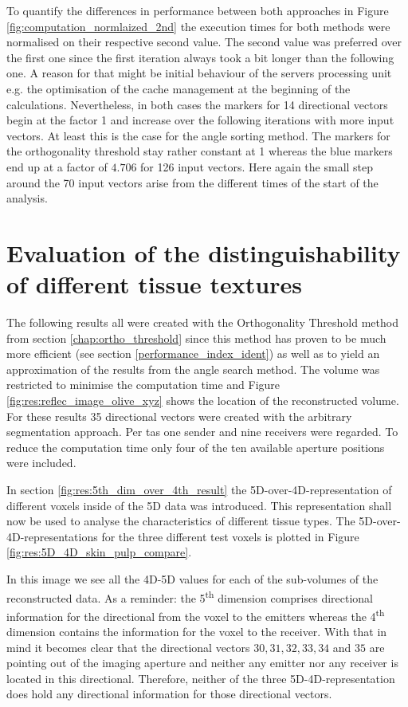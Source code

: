 To quantify the differences in performance between both approaches in Figure \ref{fig:computation_normlaized_2nd} the execution times for both methods were normalised on their respective second value. The second value was preferred over the first one since the first iteration always took a bit longer than the following one. A reason for that might be initial behaviour of the servers processing unit  e.g. the optimisation of the cache management at the beginning of the calculations. Nevertheless, in both cases the markers for 14 directional vectors begin at the factor 1 and increase over the following iterations with more input vectors. At least this is the case for the angle sorting method. The markers for the orthogonality threshold stay rather constant at 1 whereas the blue markers end up at a factor of $4.706$ for 126 input vectors. Here again the small step around the 70 input vectors arise from the different times of the start of the analysis.





\section{Evaluation of the distinguishability of different tissue textures}
\label{sec:res:eval_diff_tissue_type}


The following results all were created with the Orthogonality Threshold method from section \ref{chap:ortho_threshold} since this method has proven to be much more efficient (see section \ref{performance_index_ident}) as well as to yield an approximation of the results from the angle search method. The volume was restricted to minimise the computation time and Figure \ref{fig:res:reflec_image_olive_xyz} shows the location of the reconstructed volume. For these results 35 directional vectors were created with the arbitrary segmentation approach. Per \ac{tas} one sender and nine receivers were regarded. To reduce the computation time only four of the ten available aperture positions were included.  



In section \ref{fig:res:5th_dim_over_4th_result} the 5D-over-4D-representation of different voxels inside of the 5D data was introduced. This representation shall now be used to analyse the characteristics of different tissue types. The 5D-over-4D-representations for the three different test voxels is plotted in Figure \ref{fig:res:5D_4D_skin_pulp_compare}. 

In this image we see all the 4D-5D values for each of the sub-volumes of the reconstructed data. As a reminder: the 5\textsuperscript{th} dimension comprises directional information for the directional from the voxel to the emitters whereas the 4\textsuperscript{th} dimension contains the information for the voxel to the receiver. With that in mind it becomes clear that the directional vectors $30, 31, 32, 33, 34$ and $35$ are pointing out of the imaging aperture and neither any emitter nor any receiver is located in this directional. Therefore, neither of the three 5D-4D-representation does hold any directional information for those directional vectors.

